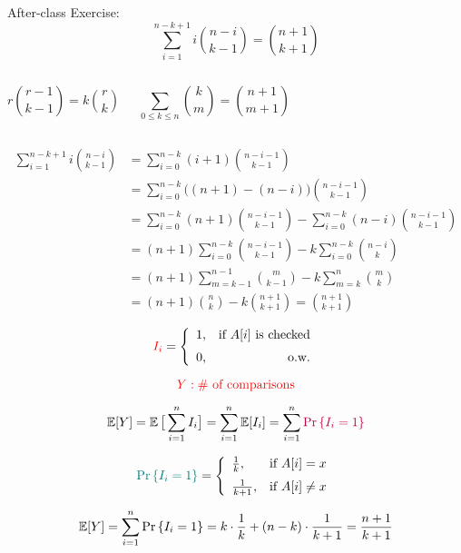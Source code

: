 \begin{frame}{}
  \begin{exampleblock}{After-class Exercise:}
    \[
      \sum_{i=1}^{n-k+1} i \binom{n-i}{k-1} = \binom{n+1}{k+1}
    \]
  \end{exampleblock}

  \begin{columns}
      \[
	r \binom{r-1}{k-1} = k \binom{r}{k}
      \]

      \vspace{0.60cm}
      \[
	\sum_{0 \le k \le n} \binom{k}{m} = \binom{n+1}{m+1}
      \]
  \end{columns}
\end{frame}

\begin{frame}{}
  \begin{align*}
    \sum_{i=1}^{n-k+1} i \binom{n-i}{k-1} &= \sum_{i=0}^{n-k} (i+1) \binom{n-i-1}{k-1} \\
    &= \sum_{i=0}^{n-k} \big((n+1) - (n-i)\big) \binom{n-i-1}{k-1} \\
    &= \sum_{i=0}^{n-k} (n+1) \binom{n-i-1}{k-1} - \sum_{i=0}^{n-k} (n-i) \binom{n-i-1}{k-1} \\
    &= (n+1) \sum_{i=0}^{n-k}\binom{n-i-1}{k-1} - k \sum_{i=0}^{n-k} \binom{n-i}{k} \\
    &= (n+1) \sum_{m=k-1}^{n-1}\binom{m}{k-1} - k \sum_{m=k}^{n} \binom{m}{k} \\
    &= (n+1) \binom{n}{k} - k \binom{n+1}{k+1} = \binom{n+1}{k+1}
  \end{align*}
\end{frame}

\begin{frame}{}
  \centerline{}

  \pause
  \[
    \textcolor{red}{I_{i}} = \left\{\begin{array}{lr}
      1, & \text{if } A[i] \text{ is checked} \\[6pt]
      0, & \text{o.w.}
    \end{array}\right.
  \]

  \pause
  \[
    \textcolor{red}{Y: \# \text{ of comparisons}}
  \]

  \pause
  \[
    \operatorname*{\mathbb{E}}[Y] = \operatorname*{\mathbb{E}}\big[\sum_{i=1}^{n} I_{i}\big] = \sum_{i=1}^{n} \operatorname*{\mathbb{E}}[I_{i}] = \sum_{i=1}^{n} \textcolor{purple}{\Pr\left\{I_{i} = 1\right\}}
  \]

  \pause
  \[
    \textcolor{teal}{\Pr\left\{I_{i} = 1\right\}} = \left\{\begin{array}{lr}
      \frac{1}{k}, & \text{if } A[i] = x \\[6pt]
      \frac{1}{k+1}, & \text{if } A[i] \neq x
    \end{array}\right.
  \]

  \pause
  \[
    \operatorname*{\mathbb{E}}[Y] = \sum_{i=1}^{n} \Pr\left\{I_{i} = 1\right\} = k \cdot \frac{1}{k} + (n-k) \cdot \frac{1}{k+1} = \frac{n+1}{k+1}
  \]
\end{frame}

